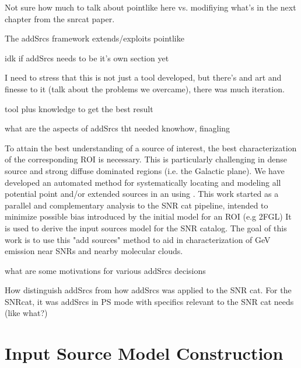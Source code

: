 {Not sure how much to talk about pointlike here vs. modifiying what's in the next chapter from the snrcat paper. 

The addSrcs framework extends/exploits pointlike 

idk if addSrcs needs to be it's own section yet

I need to stress that this is not just a tool developed, but there's and art and finesse to it (talk about the problems we overcame), there was much iteration.

tool plus knowledge to get the best result

what are the aspects of addSrcs tht needed knowhow, finagling

To attain the best understanding of a source of interest, the best characterization of the corresponding ROI is necessary. This is particularly challenging in dense source and strong diffuse dominated regions (i.e. the Galactic plane). We have developed an automated method for systematically locating and modeling all potential point and/or extended sources in an \roi using \ptlike. This work started as a parallel and complementary analysis to the SNR cat pipeline, intended to minimize possible bias introduced by the initial model for an ROI (e.g 2FGL) It is  used to derive the input sources model for the SNR catalog. The goal of this work is to use this "add sources" method to aid in characterization of GeV emission near SNRs and nearby molecular clouds.

what are some motivations for various addSrcs decisions 

How distinguish addSrcs from how addSrcs was applied to the SNR cat. For the SNRcat, it was addSrcs in PS mode with specifics relevant to the SNR cat needs (like what?)
\section{Input Source Model Construction}\label{snrCat:AddSrcs}

}
